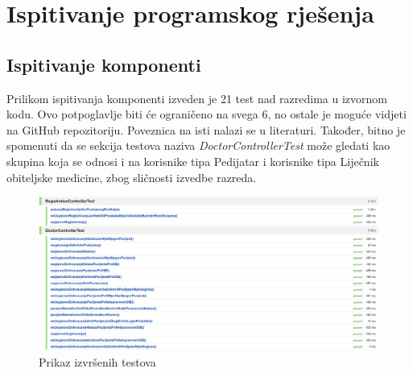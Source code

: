 			\eject 
		
	
		\section{Ispitivanje programskog rješenja}
			\subsection{Ispitivanje komponenti}
			\text Prilikom ispitivanja komponenti izveden je 21 test nad razredima u izvornom kodu. Ovo potpoglavlje biti će ograničeno na svega 6, no ostale je moguće vidjeti na GitHub repozitoriju. Poveznica na isti nalazi se u literaturi. Također, bitno je spomenuti da se sekcija testova naziva \textit{DoctorControllerTest} može gledati kao skupina koja se odnosi i na korisnike tipa Pedijatar i korisnike tipa Liječnik obiteljske medicine, zbog sličnosti izvedbe razreda.
			
			\begin{figure}[H]
				\includegraphics[scale=0.3]{slike/testoviRazreda.PNG} %
				\centering
				\caption{Prikaz izvršenih testova}
				\label{fig:slikatestova}
			\end{figure}
			
